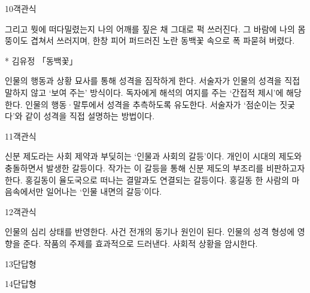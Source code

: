 \documentclass[fs9,seriesRus]{korfarm-base}
\begin{document}
\begin{kfQBlock}{10}{객관식}
\begin{kfEvidence}그리고 뭣에 떠다밀렸는지 나의 어깨를 짚은 채 그대로 퍽 쓰러진다. 그 바람에 나의 몸뚱이도 겹쳐서 쓰러지며, 한창 피어 퍼드러진 노란 동백꽃 속으로 폭 파묻혀 버렸다.

* 김유정 「동백꽃」\end{kfEvidence}
\begin{kfChoices}
\kfChoice 인물의 행동과 상황 묘사를 통해 성격을 짐작하게 한다.
\kfChoice 서술자가 인물의 성격을 직접 말하지 않고 ‘보여 주는’ 방식이다.
\kfChoice 독자에게 해석의 여지를 주는 ‘간접적 제시’에 해당한다.
\kfChoice 인물의 행동·말투에서 성격을 추측하도록 유도한다.
\kfChoice 서술자가 ‘점순이는 짓궂다’와 같이 성격을 직접 설명하는 방법이다.
\end{kfChoices}
\end{kfQBlock}
\begin{kfQBlock}{11}{객관식}
\begin{kfChoices}
\kfChoice 신분 제도라는 사회 제약과 부딪히는 ‘인물과 사회의 갈등’이다.
\kfChoice 개인이 시대의 제도와 충돌하면서 발생한 갈등이다.
\kfChoice 작가는 이 갈등을 통해 신분 제도의 부조리를 비판하고자 한다.
\kfChoice 홍길동이 율도국으로 떠나는 결말과도 연결되는 갈등이다.
\kfChoice 홍길동 한 사람의 마음속에서만 일어나는 ‘인물 내면의 갈등’이다.
\end{kfChoices}
\end{kfQBlock}
\begin{kfQBlock}{12}{객관식}
\begin{kfChoices}
\kfChoice 인물의 심리 상태를 반영한다.
\kfChoice 사건 전개의 동기나 원인이 된다.
\kfChoice 인물의 성격 형성에 영향을 준다.
\kfChoice 작품의 주제를 효과적으로 드러낸다.
\kfChoice 사회적 상황을 암시한다.
\end{kfChoices}
\end{kfQBlock}
\begin{kfQBlock}{13}{단답형}
\end{kfQBlock}
\begin{kfQBlock}{14}{단답형}
\end{kfQBlock}
\end{document}
